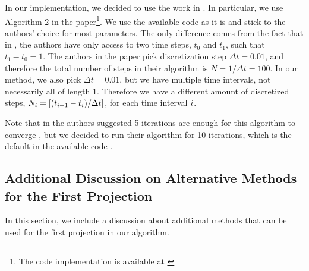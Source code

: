 In our implementation, we decided to use the work in \citet{Vargas2021}. In particular, we use Algorithm 2 in the paper\footnote{The code implementation is available at \href{https://github.com/franciscovargas/GP_Sinkhorn}{}}. We use the available code as it is and stick to the authors' choice for most parameters. The only difference comes from the fact that in \citet{Vargas2021}, the authors have only access to two time steps, $t_0$ and $t_1$, such that $t_1-t_0 = 1$. The authors in the paper pick discretization step $\Delta t = 0.01$, and therefore the total number of steps in their algorithm is $N = 1 / \Delta t = 100$. In our method, we also pick $\Delta t = 0.01$, but we have multiple time intervals, not necessarily all of length 1. Therefore we have a different amount of discretized steps, $N_i=[(t_{i+1}-t_{i})/\Delta t]$, for each time interval $i$. 

Note that in \citet{Vargas2021} the authors suggested 5 iterations are enough for this algorithm to converge \citep[see also Fig.~4 of][]{Vargas2021}, but we decided to run their algorithm for 10 iterations, which is the default in the available code \citep{gpshinkhornrepo}.

\subsection{Additional Discussion on Alternative Methods for the First Projection}
\label{app:sb-methods-discussion}

In this section, we include a discussion about additional methods that can be used for the first projection in our algorithm.

